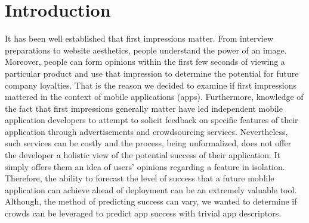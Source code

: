 \section{Introduction}


It has been well established that first impressions matter. From interview preparations to website aesthetics, people understand the power of an image. Moreover, people can form opinions within the first few seconds of viewing a particular product and use that impression to determine the potential for future company loyalties. That is the reason we decided to examine if first impressions mattered in the context of mobile applications (apps).  Furthermore, knowledge of the fact that first impressions generally matter have led independent mobile application developers to attempt to solicit feedback on specific features of their application through advertisements and crowdsourcing services. Nevertheless, such services can be costly and the process, being unformalized, does not offer the developer a holistic view of the potential success of their application.  It simply offers them an idea of users' opinions regarding a feature in isolation.  Therefore, the ability to forecast the level of success that a future moblile application can achieve ahead of deployment can be an extremely valuable tool\cite{tohidi06:getting}. Although, the method of predicting success can vary, we wanted to determine if crowds can be leveraged to predict app success with trivial app descriptors. \\  


